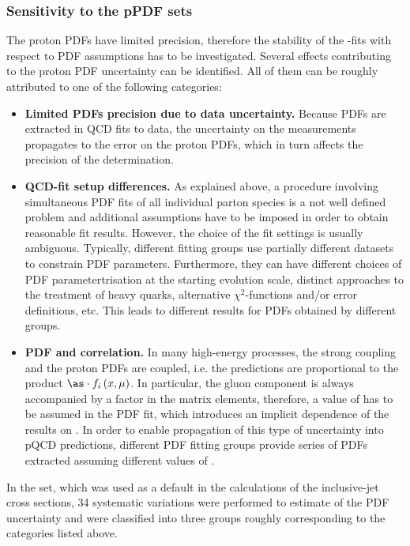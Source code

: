 \subsubsection{Sensitivity to the pPDF sets}
\label{subsec:aspdfassump}
The proton PDFs have limited precision, therefore the stability of the \asz-fits with respect to PDF assumptions has to be investigated. Several effects contributing to the proton PDF uncertainty can be identified. All of them can be roughly attributed to one of the following categories:
\begin{itemize}
 \item \textbf{Limited PDFs precision due to data uncertainty.} Because PDFs are extracted in QCD fits to data, the uncertainty on the measurements propagates to the error on the proton PDFs, which in turn affects the precision of the \asz determination.
 \item \textbf{QCD-fit setup differences.} As explained above, a procedure involving simultaneous PDF fits of all individual parton species is a not well defined problem and additional assumptions have to be imposed in order to obtain reasonable fit results. However, the choice of the fit settings is usually ambiguous. Typically, different fitting groups use partially different datasets to constrain PDF parameters. Furthermore, they can have different choices of PDF parametertrisation at the starting evolution scale, distinct approaches to the treatment of heavy quarks, alternative $\chi^2$-functions and/or error definitions, etc. This leads to different results for PDFs obtained by different groups.
 \item \textbf{PDF and \asz correlation.} In many high-energy processes, the strong coupling and the proton PDFs are coupled, i.e. the predictions are proportional to the product $\as\cdot f_i\left(x,\mu\right)$. In particular, the gluon component is always accompanied by a factor \as in the matrix elements, therefore, a value of \asz has to be assumed in the PDF fit, which introduces an implicit dependence of the results on \asz. In order to enable propagation of this type of uncertainty into pQCD predictions, different PDF fitting groups provide series of PDFs extracted assuming different values of \asz.
\end{itemize}

In the  set, which was used as a default in the calculations of the inclusive-jet cross sections, 34 systematic variations were performed to estimate of the PDF uncertainty and were classified into three groups roughly corresponding to the categories listed above. 

